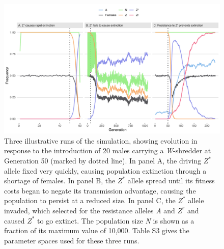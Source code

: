 \documentclass[]{rsos}%
\begin{document}
\begin{figure}[h]
\centering
\includegraphics[width=1.0\textwidth]{../figures/figure1.pdf}
\caption{\footnotesize{Three illustrative runs of the simulation, showing evolution in response to the introduction of 20 males carrying a \textit{W}-shredder at Generation 50 (marked by dotted line). In panel A, the driving $Z^*$ allele fixed very quickly, causing population extinction through a shortage of females. In panel B, the $Z^*$ allele spread until its fitness costs began to negate its transmission advantage, causing the population to persist at a reduced size. In panel C, the $Z^*$ allele invaded, which selected for the resistance alleles \textit{A} and $Z^r$ and caused $Z^*$ to go extinct. The population size \textit{N} is shown as a fraction of its maximum value of 10,000. Table S3 gives the parameter spaces used for these three runs.}}
\end{figure}
\newpage
\end{document}
